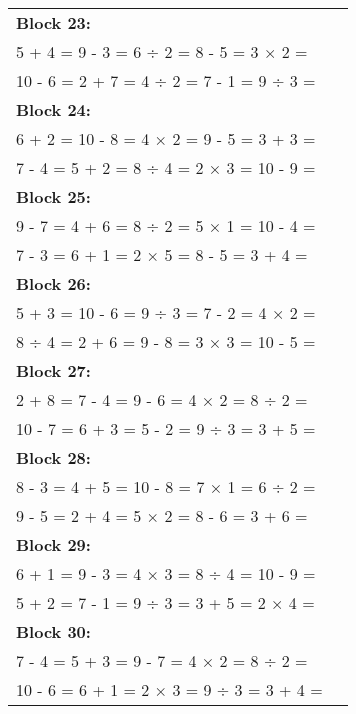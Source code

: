 \documentclass[a4paper,12pt]{scrartcl}
\begin{document}
\begin{adjustbox}{center, valign=c}
\begin{tabular}{@{}p{0.95\linewidth}@{}}

\textbf{Block 23:}\\
5 + 4 = \hfill 9 - 3 = \hfill 6 ÷ 2 = \hfill 8 - 5 = \hfill 3 × 2 =\\
10 - 6 = \hfill 2 + 7 = \hfill 4 ÷ 2 = \hfill 7 - 1 = \hfill 9 ÷ 3 =\\[0.6em]

\textbf{Block 24:}\\
6 + 2 = \hfill 10 - 8 = \hfill 4 × 2 = \hfill 9 - 5 = \hfill 3 + 3 =\\
7 - 4 = \hfill 5 + 2 = \hfill 8 ÷ 4 = \hfill 2 × 3 = \hfill 10 - 9 =\\[0.6em]

\textbf{Block 25:}\\
9 - 7 = \hfill 4 + 6 = \hfill 8 ÷ 2 = \hfill 5 × 1 = \hfill 10 - 4 =\\
7 - 3 = \hfill 6 + 1 = \hfill 2 × 5 = \hfill 8 - 5 = \hfill 3 + 4 =\\[0.6em]

\textbf{Block 26:}\\
5 + 3 = \hfill 10 - 6 = \hfill 9 ÷ 3 = \hfill 7 - 2 = \hfill 4 × 2 =\\
8 ÷ 4 = \hfill 2 + 6 = \hfill 9 - 8 = \hfill 3 × 3 = \hfill 10 - 5 =\\[0.6em]

\textbf{Block 27:}\\
2 + 8 = \hfill 7 - 4 = \hfill 9 - 6 = \hfill 4 × 2 = \hfill 8 ÷ 2 =\\
10 - 7 = \hfill 6 + 3 = \hfill 5 - 2 = \hfill 9 ÷ 3 = \hfill 3 + 5 =\\[0.6em]

\textbf{Block 28:}\\
8 - 3 = \hfill 4 + 5 = \hfill 10 - 8 = \hfill 7 × 1 = \hfill 6 ÷ 2 =\\
9 - 5 = \hfill 2 + 4 = \hfill 5 × 2 = \hfill 8 - 6 = \hfill 3 + 6 =\\[0.6em]

\textbf{Block 29:}\\
6 + 1 = \hfill 9 - 3 = \hfill 4 × 3 = \hfill 8 ÷ 4 = \hfill 10 - 9 =\\
5 + 2 = \hfill 7 - 1 = \hfill 9 ÷ 3 = \hfill 3 + 5 = \hfill 2 × 4 =\\[0.6em]

\textbf{Block 30:}\\
7 - 4 = \hfill 5 + 3 = \hfill 9 - 7 = \hfill 4 × 2 = \hfill 8 ÷ 2 =\\
10 - 6 = \hfill 6 + 1 = \hfill 2 × 3 = \hfill 9 ÷ 3 = \hfill 3 + 4 =\\[0.6em]


\end{tabular}
\end{adjustbox}
\end{document}

